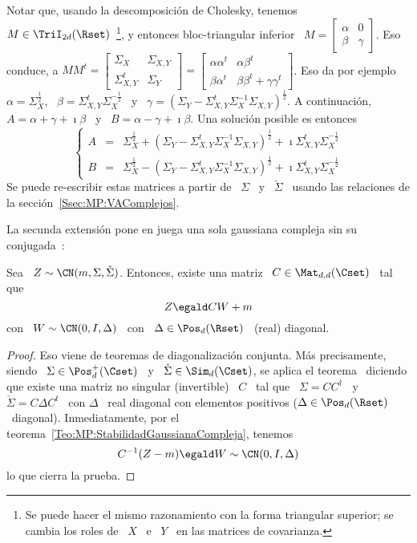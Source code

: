 %
Notar  que,   usando  la  descomposici\'on   de  Cholesky,  tenemos  \   $M  \in
\TriI_{2d}(\Rset)$~\footnote{Se puede  hacer el mismo razonamiento  con la forma
  triangular superior; se cambia los roles de \  $X$ \ e \ $Y$ \ en las matrices
  de covarianza.},  y entonces bloc-triangular  inferior \ $M  = \begin{bmatrix}
  \alpha  &  0  \\  \beta  &  \gamma \end{bmatrix}$.   Eso  conduce,  a  $M  M^t
= \begin{bmatrix} \Sigma_X & \Sigma_{X,Y} \\ \Sigma_{X,Y}^t &
  \Sigma_Y \end{bmatrix}  = \begin{bmatrix} \alpha \alpha^t &  \alpha \beta^t \\
  \beta \alpha^t &  \beta \beta^t + \gamma \gamma^t  \end{bmatrix}$.  Eso da por
ejemplo   \   $\alpha  =   \Sigma_X^{\frac12}$,   \   $\beta  =   \Sigma_{X,Y}^t
\Sigma_X^{-\frac12}$  \   y  \  $\gamma  =  \left(   \Sigma_Y  -  \Sigma_{X,Y}^t
  \Sigma_X^{-1} \Sigma_{X,Y} \right)^{\frac12}$.   A continuaci\'on, $A = \alpha
+  \gamma +  \imath \beta$  \ y  \ $B  = \alpha  - \gamma  + \imath  \beta$. Una
soluci\'on posible es entonces
%
\[
\left\{\begin{array}{lll}
A & = & \Sigma_X^{\frac12} + \left( \Sigma_Y - \Sigma_{X,Y}^t \Sigma_X^{-1} \Sigma_{X,Y}
\right)^{\frac12}  + \imath \Sigma_{X,Y}^t
\Sigma_X^{-\frac12}\\[2.5mm]
%
B & = &  \Sigma_X^{\frac12} - \left( \Sigma_Y - \Sigma_{X,Y}^t \Sigma_X^{-1} \Sigma_{X,Y}
\right)^{\frac12} + \imath \Sigma_{X,Y}^t
\Sigma_X^{-\frac12}
\end{array}\right.
\]
%
Se  puede   re-escribir  estas  matrices   a  partir  de   \  $\Sigma$  \   y  \
$\check{\Sigma}$       \      usando       las       relaciones      de       la
secci\'on~\ref{Ssec:MP:VAComplejos}.

La  secunda  extensi\'on  pone  en  juega  una sola  gaussiana  compleja  sin  su
conjugada~\cite{EriKoi06, SchSch03}:
%
\begin{teorema}
\label{Teo:MP:GaussianaComplejaWIDiago}
%
  Sea \ $Z \sim \CN(m,\Sigma,\check{\Sigma})$. Entonces, existe una matriz \ $C
  \in \Mat_{d,d}(\Cset)$ \ tal que
  \[
  Z \egald C W + m
  \]
  con \ $W \sim \CN(0,I,\Delta)$ \ con \ $\Delta \in \Pos_d(\Rset)$ \ (real) diagonal.
\end{teorema}
\begin{proof}
  Eso  viene  de teoremas  de  diagonalizaci\'on  conjunta. M\'as  precisamente,
  siendo \ $\Sigma  \in \Pos_d^+(\Cset)$ \ y \  $\check{\Sigma} \in \Sim_d(\Cset)$, se
  aplica el  teorema~\cite[Teo.~7.6.5]{HorJoh13} diciendo que  existe una matriz
  no  singular (invertible)  \  $C$ \  tal  que \  $\Sigma  = C  C^\dag$  \ y  \
  $\check{\Sigma} = C  \Delta C^t$ \ con $\Delta$ \  real diagonal con elementos
  positivos  ($\Delta  \in  \Pos_d(\Rset)$  \  diagonal).  Inmediatamente,  por  el
  teorema~\ref{Teo:MP:StabilidadGaussianaCompleja}, tenemos
  \[
  C^{-1} (Z - m) \egald W \sim \CN(0,I,\Delta)
  \]
  lo que cierra la prueba.
\end{proof}


